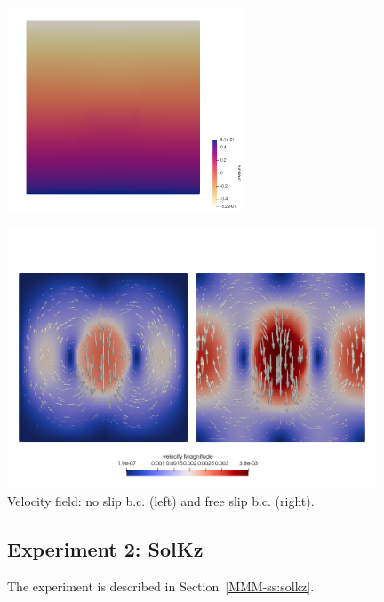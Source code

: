 \begin{center}
\includegraphics[width=7cm]{python_codes/fieldstone_158/results/exp1/press}
\end{center} 

\begin{center}
\includegraphics[width=11cm]{python_codes/fieldstone_158/results/exp1/both}\\
{\captionfont Velocity field: no slip b.c. (left) and free slip b.c. (right).}
\end{center} 


\newpage
\subsection*{Experiment 2: SolKz}

The experiment is described in Section~\ref{MMM-ss:solkz}.

